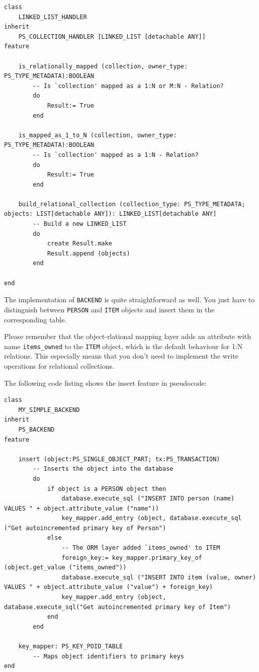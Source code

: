 \documentclass[a4paper,12pt]{report}
\begin{document}
\begin{lstlisting}[language=OOSC2Eiffel, captionpos=b, caption={The collection handler for LINKED\_LIST}, label={lst:my_linked_list_collection_handler}]
class 
	LINKED_LIST_HANDLER
inherit
	PS_COLLECTION_HANDLER [LINKED_LIST [detachable ANY]]
feature

	is_relationally_mapped (collection, owner_type: PS_TYPE_METADATA):BOOLEAN
		-- Is `collection' mapped as a 1:N or M:N - Relation?
		do
			Result:= True
		end

	is_mapped_as_1_to_N (collection, owner_type: PS_TYPE_METADATA):BOOLEAN
		-- Is `collection' mapped as a 1:N - Relation?
		do
			Result:= True
		end

	build_relational_collection (collection_type: PS_TYPE_METADATA; objects: LIST[detachable ANY]): LINKED_LIST[detachable ANY]
		-- Build a new LINKED_LIST
		do
			create Result.make
			Result.append (objects)
		end

end
\end{lstlisting}


The implementation of \lstinline!BACKEND! is quite straightforward as well.
You just have to distinguish between \lstinline!PERSON! and \lstinline!ITEM! objects and insert them in the corresponding table.

Please remember that the object-rlational mapping layer adds an attribute with name \lstinline!items_owned! to the \lstinline!ITEM! object, which is the default behaviour for 1:N relations.
This especially means that you don't need to implement the write operations for relational collections.

The following code listing shows the insert feature in pseudocode:

\begin{lstlisting}[language=OOSC2Eiffel, captionpos=b, caption={The collection handler for LINKED\_LIST}, label={lst:my_backend_adaption}]
class 
	MY_SIMPLE_BACKEND
inherit
	PS_BACKEND
feature

	insert (object:PS_SINGLE_OBJECT_PART; tx:PS_TRANSACTION)
		-- Inserts the object into the database
		do
			if object is a PERSON object then
				database.execute_sql ("INSERT INTO person (name) VALUES " + object.attribute_value ("name"))
				key_mapper.add_entry (object, database.execute_sql ("Get autoincremented primary key of Person")
			else
				-- The ORM layer added `items_owned' to ITEM
				foreign_key:= key_mapper.primary_key_of (object.get_value ("items_owned"))
				database.execute_sql ("INSERT INTO item (value, owner) VALUES " + object.attribute_value ("value") + foreign_key)
				key_mapper.add_entry (object, database.execute_sql("Get autoincremented primary key of Item")
			end
		end

	key_mapper: PS_KEY_POID_TABLE
		-- Maps object identifiers to primary keys
end
\end{lstlisting}
\end{document}
